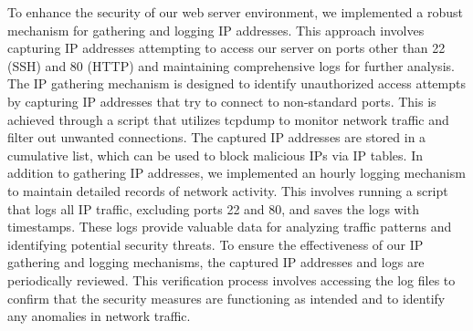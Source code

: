 
To enhance the security of our web server environment, we implemented a robust mechanism for gathering and logging IP addresses. This approach involves capturing IP addresses attempting 
to access our server on ports other than 22 (SSH) and 80 (HTTP) and maintaining comprehensive logs for further analysis. The IP gathering mechanism is designed to identify unauthorized access 
attempts by capturing IP addresses that try to connect to non-standard ports. This is achieved through a script that utilizes tcpdump to monitor network traffic and filter out unwanted connections. 
The captured IP addresses are stored in a cumulative list, which can be used to block malicious IPs via IP tables. In addition to gathering IP addresses, we implemented an hourly logging mechanism to 
maintain detailed records of network activity. This involves running a script that logs all IP traffic, excluding ports 22 and 80, and saves the logs with timestamps. These logs provide valuable data 
for analyzing traffic patterns and identifying potential security threats. To ensure the effectiveness of our IP gathering and logging mechanisms, the captured IP addresses and logs are periodically 
reviewed. This verification process involves accessing the log files to confirm that the security measures are functioning as intended and to identify any anomalies in network traffic.
